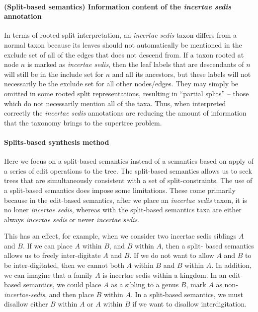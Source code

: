 \documentclass[english]{article}
\begin{document}


\paragraph{(Split-based semantics) Information content of the \emph{incertae sedis} annotation}

In terms of rooted split interpretation, an \emph{incertae sedis} taxon differs
from a normal taxon because its leaves should not automatically be mentioned in
the exclude set of all of the edges that does not descend from. If a taxon
rooted at node $n$ is marked as \emph{incertae sedis}, then the leaf labels that
are descendants of $n$ will still be in the include set for $n$ and all its ancestors,
but these labels will not necessarily be the exclude set for all other
nodes/edges. They may simply be omitted in some rooted split representations,
resulting in ``partial splits'' -- those which do not necessarily mention all of
the taxa. Thus, when interpreted correctly the \emph{incertae sedis} annotations
are reducing the amount of information that the taxonomy brings to the supertree
problem.

\paragraph{Splits-based synthesis method}

Here we focus on a split-based semantics instead of a semantics based on apply
of a series of edit operations to the tree. The split-based semantics allows us
to seek trees that are simultaneously consistent with a set of split-constraints.
The use of a split-based semantics does impose some limitations. These come
primarily because in the edit-based semantics, after we place an
\emph{incertae sedis} taxon, it is no loner \emph{incertae sedis}, whereas with
the split-based semantics taxa are either always \emph{incertae sedis} or never
\emph{incertae sedis}.

This has an effect, for example, when we consider two incertae sedis siblings $A$
and $B$. If we can place $A$ within $B$, and $B$ within $A$, then a split- based
semantics allows us to freely inter-digitate $A$ and $B$. If we do not want to
allow $A$ and $B$ to be inter-digitated, then we cannot both $A$ within $B$ and $B$
within $A$. In addition, we can imagine that a family $A$ is incertae sedis within a
kingdom. In an edit-based semantics, we could place $A$ as a sibling to a genus $B$,
mark $A$ as non-\emph{incertae-sedis}, and then place $B$ within $A$. In a split-based
semantics, we must disallow either $B$ within $A$ or $A$ within $B$ if we want to disallow
interdigitation.
\end{document}
